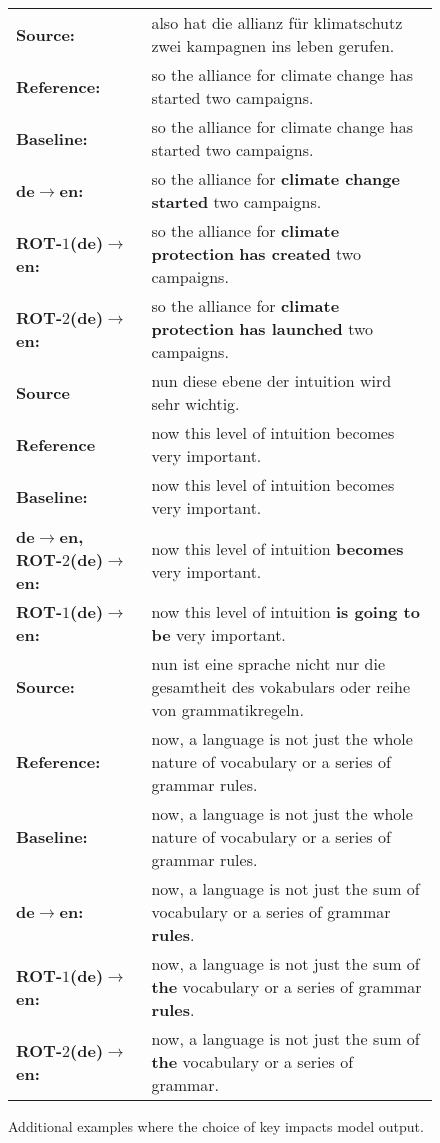 \documentclass[11pt]{article}
\begin{document}
\begin{sidewaysfigure*}[p]
{\begin{tabular}{l l}
        \midrule\midrule
        \textbf{Source:} & 
        also hat die allianz f\"ur klimatschutz zwei kampagnen ins leben gerufen. \\
        \textbf{Reference:} & 
        so the alliance for climate change has started two campaigns. \\\midrule
        \textbf{Baseline:} & so the alliance for climate change has started two campaigns. \\\midrule
        \textbf{de$\rightarrow$en:} & 
        so the alliance for \textbf{climate change} \textbf{started} two campaigns. \\
        \textbf{ROT-$1$(de)$\rightarrow$en:} & 
        so the alliance for \textbf{climate protection} \textbf{has created} two campaigns. \\
        \textbf{ROT-$2$(de)$\rightarrow$en:} & 
        so the alliance for \textbf{climate protection} \textbf{has launched} two campaigns. \\
        
        \midrule\midrule
        \textbf{Source} & 
        nun diese ebene der intuition wird sehr wichtig. \\
        \textbf{Reference} & 
        now this level of intuition becomes very important.\\
        \midrule
        \textbf{Baseline:} & now this level of intuition becomes very important. \\\midrule
        \textbf{de$\rightarrow$en, ROT-$2$(de)$\rightarrow$en:} & 
        now this level of intuition \textbf{becomes} very important.\\
        \textbf{ROT-$1$(de)$\rightarrow$en:} & 
        now this level of intuition \textbf{is going to be} very important.\\
        
        \midrule\midrule
        \textbf{Source:} & 
        nun ist eine sprache nicht nur die gesamtheit des vokabulars oder reihe von grammatikregeln. \\
        \textbf{Reference:} & 
        now, a language is not just the whole nature of vocabulary or a series of grammar rules. \\\midrule
        \textbf{Baseline:} & now, a language is not just the whole nature of vocabulary or a series of grammar rules. \\\midrule
        \textbf{de$\rightarrow$en:} & 
        now, a language is not just the sum of vocabulary or a series of grammar \textbf{rules}. \\
        \textbf{ROT-$1$(de)$\rightarrow$en:} & 
        now, a language is not just the sum of \textbf{the} vocabulary or a series of grammar \textbf{rules}. \\
        \textbf{ROT-$2$(de)$\rightarrow$en:} & 
        now, a language is not just the sum of \textbf{the} vocabulary or a series of grammar. \\
        
        \bottomrule
    \end{tabular}
    }
    \caption{Additional examples where the choice of key impacts model output.}
    \label{fig:cipher_vs_plaintext_extra}
\end{sidewaysfigure*}
\end{document}
